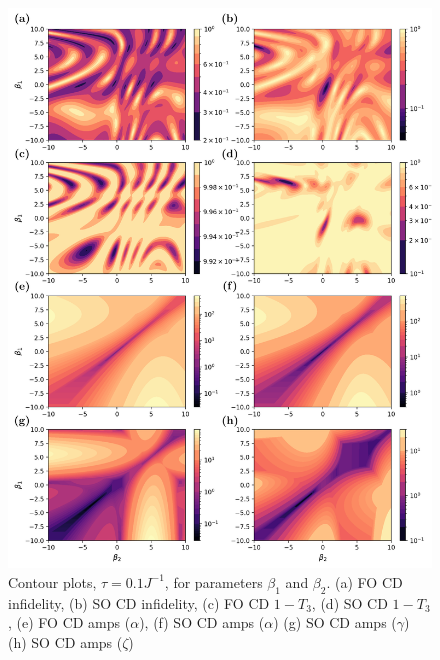 \begin{figure}[t]
    \centering
    \includegraphics[width=\linewidth]{images/ghz_contour_plots.png} \caption[Contour plots of cost function landscapes for GHZ state preparation in frustrated spin systems.]{Contour plots, $\tau = 0.1 J^{-1}$,  for parameters $\beta_1$ and $\beta_2$. (a) FO CD infidelity, (b) SO CD infidelity, (c) FO CD $1 - T_3$, (d) SO CD $1 - T_3$, (e) FO CD amps ($\alpha$), (f) SO CD amps ($\alpha$) (g) SO CD amps ($\gamma$) (h) SO CD amps ($\zeta$)}\label{fig:ghz_contours}
\end{figure}